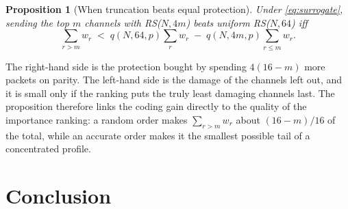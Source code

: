 \documentclass[conference]{IEEEtran}
\newtheorem{proposition}{Proposition}
\begin{document}
\begin{proposition}[When truncation beats equal protection]\label{prop:trunc}
Under \eqref{eq:surrogate}, sending the top $m$ channels with RS($N,4m$) beats uniform RS($N,64$) iff
\begin{equation}
\textstyle\sum_{r>m} w_r \;<\; q(N,64,p)\sum_{r} w_r \;-\; q(N,4m,p)\sum_{r\le m} w_r .
\end{equation}
\end{proposition}
The right-hand side is the protection bought by spending $4(16-m)$ more packets on parity. The left-hand
side is the damage of the channels left out, and it is small only if the ranking puts the truly least
damaging channels last. The proposition therefore links the coding gain directly to the quality of the
importance ranking: a random order makes $\sum_{r>m}w_r$ about $(16-m)/16$ of the total, while an
accurate order makes it the smallest possible tail of a concentrated profile.



\section{Conclusion}




\end{document}
